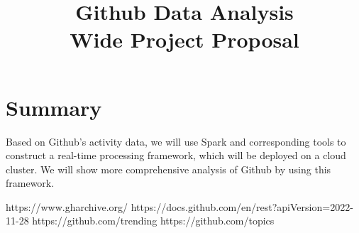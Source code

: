 \documentclass[conference]{IEEEtran}
\begin{document}
\title{Github Data Analysis\\
{\small Wide Project Proposal}
}

\author{
\and
{}
}

\maketitle













\section{Summary}

Based on Github's activity data, we will use Spark and corresponding tools to construct a real-time processing framework, which will be deployed on a cloud cluster. We will show more comprehensive analysis of Github by using this framework.







\begin{thebibliography}{00}
https://www.gharchive.org/
https://docs.github.com/en/rest?apiVersion=2022-11-28
https://github.com/trending
https://github.com/topics
\end{thebibliography}


\end{document}
